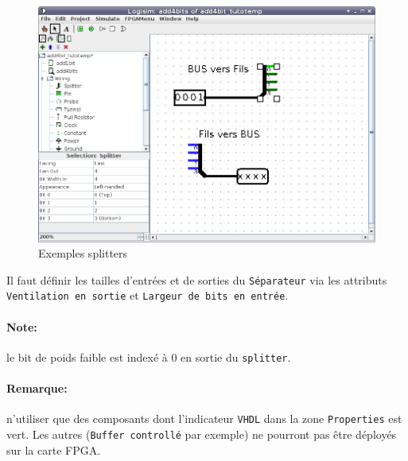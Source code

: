 \begin{figure}[H]
\begin{center}
\includegraphics[width=500pt]{pictures/logisim_splitters.png}
\caption{\label{fig_splitter}Exemples splitters}
\end{center}
\end{figure}

Il faut définir les tailles d'entrées et de sorties du \texttt{Séparateur} via les attributs \texttt{Ventilation en sortie} et
\texttt{Largeur de bits en entrée}.

\paragraph{Note:} le bit de poids faible est indexé à 0 en sortie du \texttt{splitter}.

\paragraph{Remarque:} n'utiliser que des composants dont l'indicateur \texttt{VHDL} dans la zone \texttt{Properties} est vert. 
Les autres (\texttt{Buffer controllé} par exemple) ne pourront pas être déployés sur la carte FPGA.
